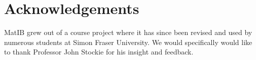 \documentclass{article}
\begin{document}
\section{Acknowledgements}\label{sec:acknowledgements}

MatIB grew out of a course project where it has since been revised and used by numerous students at Simon Fraser University.
We would specifically would like to thank Professor John Stockie for his insight and feedback.

\newpage



\end{document}
